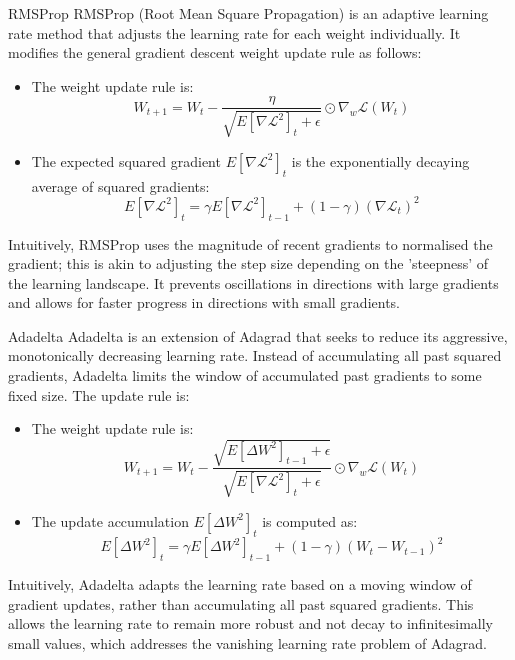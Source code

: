 \begin{definitionbox}{RMSProp}
RMSProp (Root Mean Square Propagation) is an adaptive learning rate method that adjusts the learning rate for each weight individually. It modifies the general gradient descent weight update rule as follows:
\begin{itemize}
    \item The weight update rule is:
    \[ W_{t+1} = W_t - \frac{\eta}{\sqrt{E[\nabla \mathcal{L}^2]_t + \epsilon}} \odot \nabla_w \mathcal{L}(W_t) \]
    \item The expected squared gradient \( E[\nabla \mathcal{L}^2]_t \) is the exponentially decaying average of squared gradients:
    \[ E[\nabla \mathcal{L}^2]_t = \gamma E[\nabla \mathcal{L}^2]_{t-1} + (1 - \gamma)(\nabla \mathcal{L}_t)^2 \]
\end{itemize}
Intuitively, RMSProp uses the magnitude of recent gradients to normalised the gradient; this is akin to adjusting the step size depending on the 'steepness' of the learning landscape. It prevents oscillations in directions with large gradients and allows for faster progress in directions with small gradients.
\end{definitionbox}

\begin{definitionbox}{Adadelta}
Adadelta is an extension of Adagrad that seeks to reduce its aggressive, monotonically decreasing learning rate. Instead of accumulating all past squared gradients, Adadelta limits the window of accumulated past gradients to some fixed size. The update rule is:
\begin{itemize}
    \item The weight update rule is:
    \[ W_{t+1} = W_t - \frac{\sqrt{E[\Delta W^2]_{t-1} + \epsilon}}{\sqrt{E[\nabla \mathcal{L}^2]_t + \epsilon}} \odot \nabla_w \mathcal{L}(W_t) \]
    \item The update accumulation \( E[\Delta W^2]_t \) is computed as:
    \[ E[\Delta W^2]_t = \gamma E[\Delta W^2]_{t-1} + (1 - \gamma)(W_t - W_{t-1})^2 \]
\end{itemize}
Intuitively, Adadelta adapts the learning rate based on a moving window of gradient updates, rather than accumulating all past squared gradients. This allows the learning rate to remain more robust and not decay to infinitesimally small values, which addresses the vanishing learning rate problem of Adagrad.
\end{definitionbox}

